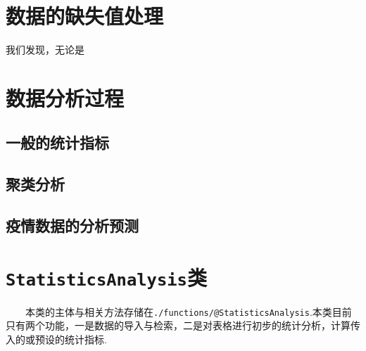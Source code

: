 \documentclass[a4paper, titlepage]{article}
\begin{document}
    \section{数据的缺失值处理}
        我们发现，无论是\texttt{}
    \section{数据分析过程}
    \subsection{一般的统计指标}
    \subsection{聚类分析}
    \subsection{疫情数据的分析预测}
    \newpage
    \appendix
    \section{\texttt{StatisticsAnalysis}类}\label{app:StatisticsAnalysis}
    　　本类的主体与相关方法存储在\texttt{./functions/@StatisticsAnalysis}.本类目前只有两个功能，一是数据的导入与检索，二是对表格进行初步的统计分析，计算传入的或预设的统计指标. 
    
\end{document}
